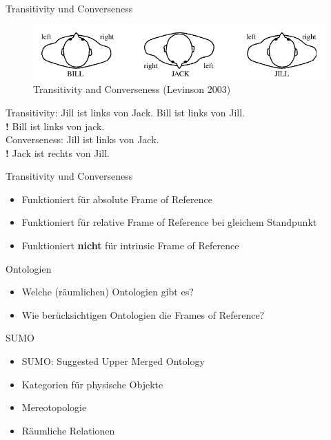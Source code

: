 \documentclass[12pt,a4paper]{beamer}
\begin{document}
\begin{frame}{Transitivity und Converseness}
\begin{figure}
\includegraphics[scale=0.45]{img/levinson_FOR_transitivity.png}
\caption{Transitivity and Converseness (Levinson 2003)}
\end{figure}
Transitivity: Jill ist links von Jack. Bill ist links von Jill. \\
\textbf{!} Bill ist links von jack.\\
Converseness: Jill ist links von Jack. \\
\textbf{!} Jack ist rechts von Jill.
\end{frame}



\begin{frame}{Transitivity und Converseness}
\begin{itemize}
\item Funktioniert für absolute Frame of Reference
\item Funktioniert für relative Frame of Reference bei gleichem Standpunkt
\item Funktioniert \textbf{nicht} für intrinsic Frame of Reference
\end{itemize}
\end{frame}


\begin{frame}{Ontologien}
\begin{itemize}
\item Welche (räumlichen) Ontologien gibt es?
\item Wie berücksichtigen Ontologien die Frames of Reference?
\end{itemize}
\end{frame}


\begin{frame}{SUMO}
\begin{itemize}
\item SUMO: Suggested Upper Merged Ontology
\item Kategorien für physische Objekte
\item Mereotopologie
\item Räumliche Relationen
\end{itemize}
\end{frame}
\end{document}
